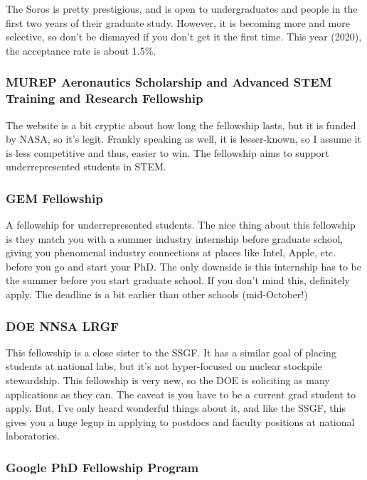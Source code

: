 \documentclass[12pt]{article}
\begin{document}
The Soros is pretty prestigious, and is open to undergraduates and people in the first two years of their graduate study. However, it is becoming more and more selective, so don’t be dismayed if you don’t get it the first time. This year (2020), the acceptance rate is about 1.5\%.

\subsubsection{MUREP Aeronautics Scholarship and Advanced STEM Training and Research Fellowship
}

The website is a bit cryptic about how long the fellowship lasts, but it is funded by NASA, so it’s legit. Frankly speaking as well, it is lesser-known, so I assume it is less competitive and thus, easier to win. The fellowship aims to support underrepresented students in STEM.

\subsubsection{GEM Fellowship}

A fellowship for underrepresented students. The nice thing about this fellowship is they match you with a summer industry internship before graduate school, giving you phenomenal industry connections at places like Intel, Apple, etc. before you go and start your PhD. The only downside is this internship has to be the summer before you start graduate school. If you don’t mind this, definitely apply. The deadline is a bit earlier than other schools (mid-October!)

\subsubsection{DOE NNSA LRGF}

This fellowship is a close sister to the SSGF. It has a similar goal of placing students at national labs, but it's not hyper-focused on nuclear stockpile stewardship. This fellowship is very new, so the DOE is soliciting as many applications as they can. The caveat is you have to be a current grad student to apply. But, I've only heard wonderful things about it, and like the SSGF, this gives you a huge legup in applying to postdocs and faculty positions at national laboratories.

\subsubsection{Google PhD Fellowship Program}
\end{document}
